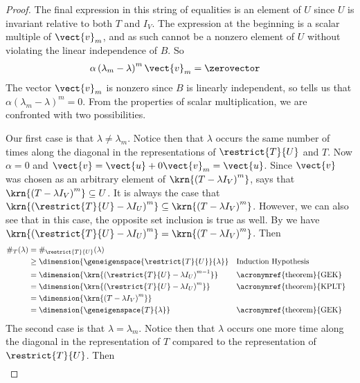 \begin{proof}
%
The final expression in this string of equalities is an element of $U$ since $U$ is invariant relative to both $T$ and $I_V$.  The expression at the beginning is a scalar multiple of $\vect{v}_m$, and as such cannot be a nonzero element of $U$ without violating the linear independence of $B$.  So 
%
\begin{align*}
\alpha\left(\lambda_m-\lambda\right)^m\vect{v}_m&=\zerovector
\end{align*}
%
The vector $\vect{v}_m$ is nonzero since $B$ is linearly independent, so  tells us that $\alpha\left(\lambda_m-\lambda\right)^m=0$.  From the properties of scalar multiplication, we are confronted with two possibilities.\par
%
Our first case is that $\lambda\neq\lambda_m$.  Notice then that $\lambda$ occurs the same number of times along the diagonal in the representations of $\restrict{T}{U}$ and $T$.  Now $\alpha=0$ and $\vect{v}=\vect{u}+0\vect{v}_m=\vect{u}$.   Since $\vect{v}$ was chosen as an arbitrary element of $\krn{\left(T-\lambda I_V\right)^m}$,  says that $\krn{\left(T-\lambda I_V\right)^m}\subseteq U$.  It is always the case that $\krn{\left(\restrict{T}{U}-\lambda I_U\right)^m}\subseteq\krn{\left(T-\lambda I_V\right)^m}$.  However, we can also see that in this case, the opposite set inclusion is true as well.  By  we have $\krn{\left(\restrict{T}{U}-\lambda I_U\right)^m}=\krn{\left(T-\lambda I_V\right)^m}$.  Then
%
\begin{align*}
\#_{T}(\lambda)
&=\#_{\restrict{T}{U}}(\lambda)\\
%
&\geq\dimension{\geneigenspace{\restrict{T}{U}}{\lambda}}
&&\text{Induction Hypothesis}\\
%
&=\dimension{\krn{\left(\restrict{T}{U}-\lambda I_U\right)^{m-1}}}
&&\text{\acronymref{theorem}{GEK}}\\
%
&=\dimension{\krn{\left(\restrict{T}{U}-\lambda I_U\right)^m}}
&&\text{\acronymref{theorem}{KPLT}}\\
%
&=\dimension{\krn{\left(T-\lambda I_V\right)^m}}\\
%
&=\dimension{\geneigenspace{T}{\lambda}}
&&\text{\acronymref{theorem}{GEK}}\\
%
\end{align*}
%
The second case is that $\lambda=\lambda_m$.  Notice then that $\lambda$ occurs one more time along the diagonal in the representation of $T$ compared to the representation of $\restrict{T}{U}$.
Then
%
\begin{align*}

\end{align*}
\end{proof}
